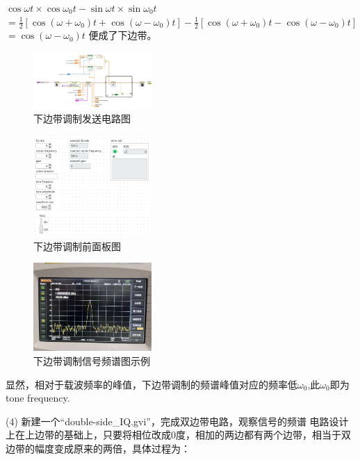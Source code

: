 \documentclass{../source/Experiment}
\begin{document}
        $\cos \omega t \times \cos \omega_{0} t-\sin \omega t \times \sin \omega_{0} t$
$=\frac{1}{2}\left[\cos \left(\omega+\omega_{0}\right) t+\cos \left(\omega-\omega_{0}\right) t\right]-\frac{1}{2}\left[\cos \left(\omega+\omega_{0}\right) t-\cos \left(\omega-\omega_{0}\right) t\right]$
$=\cos \left(\omega-\omega_{0}\right) t$
        便成了下边带。
        \begin{figure}[H]
            \centering
            \includegraphics[width = 0.4\textwidth]{lab9/lower-side_IQ-a.jpg}
            \caption{下边带调制发送电路图}
        \end{figure}
        \begin{figure}[H]
            \centering
            \includegraphics[width = 0.4\textwidth]{lab9/lower-side_IQ-b.jpg}
            \caption{下边带调制前面板图}
        \end{figure}
        
        \begin{figure}[H]
            \centering
            \includegraphics[width = 0.4\textwidth,angle=180]{lab9/6.jpg}
            \caption{下边带调制信号频谱图示例}
        \end{figure}
        显然，相对于载波频率的峰值，下边带调制的频谱峰值对应的频率低$\omega_0$,此$\omega_0$即为tone frequency.

        
        (4) 新建一个“double-side\_IQ.gvi”，完成双边带电路，观察信号的频谱
        电路设计上在上边带的基础上，只要将相位改成0度，相加的两边都有两个边带，相当于双边带的幅度变成原来的两倍，具体过程为：
        
\end{document}
